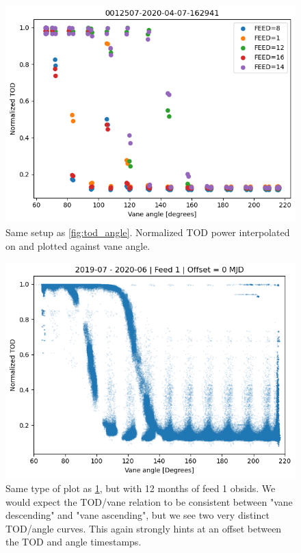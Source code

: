 \documentclass[10pt, a4paper]{article}
\begin{document}
\begin{figure}[h!]
    \centering
    \includegraphics[scale=0.6]{../power_angle_single.png}
    \caption{Same setup as \ref{fig:tod_angle}. Normalized TOD power interpolated on and plotted against vane angle.}
    \label{fig:power_angle_single}
\end{figure}


\begin{figure}[h!]
    \centering
    \includegraphics[scale=0.6]{../power_angle_all_0.png}
    \caption{Same type of plot as \ref{fig:power_angle_single}, but with 12 months of feed 1 obsids. We would expect the TOD/vane relation to be consistent between "vane descending" and "vane ascending", but we see two very distinct TOD/angle curves. This again strongly hints at an offset between the TOD and angle timestamps.}
    \label{}
\end{figure}
\end{document}
